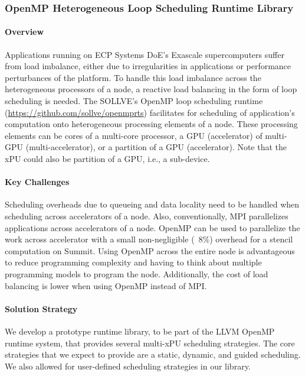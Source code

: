 \subsubsection{ OpenMP Heterogeneous Loop Scheduling Runtime Library}

\paragraph{Overview}


Applications running on ECP Systems DoE's Exascale supercomputers suffer from load imbalance, either due to irregularities in applications or performance perturbances of the platform. To handle this load imbalance across the heterogeneous processors of a node, a reactive load balancing in the form of loop scheduling is needed. 
  The SOLLVE's OpenMP loop scheduling runtime (\url{https://github.com/sollve/openmprts}) facilitates for scheduling of application's computation onto heterogeneous processing elements of a node. These processing elements can be cores of a multi-core processor, a GPU (accelerator) of multi-GPU (multi-accelerator), or a partition of a GPU (accelerator). Note that the xPU could also be partition of a GPU, i.e., a sub-device. 

\paragraph{Key Challenges}

Scheduling overheads due to queueing and data locality need to be handled when scheduling across accelerators of a node. Also, conventionally, MPI parallelizes applications across accelerators of a node. OpenMP can be used to parallelize the work across accelerator with a small non-negligible (~8\%) overhead for a stencil computation on Summit. Using OpenMP across the entire node is advantageous to reduce programming complexity and having to think about multiple programming models to program the node. Additionally, the cost of load balancing is lower when using OpenMP instead of MPI.

\paragraph{Solution Strategy}

We develop a prototype runtime library, to be part of the LLVM OpenMP runtime system, that provides several multi-xPU scheduling strategies. The core strategies that we expect to provide are a static, dynamic, and guided scheduling. We also allowed for user-defined scheduling strategies in our library. 

